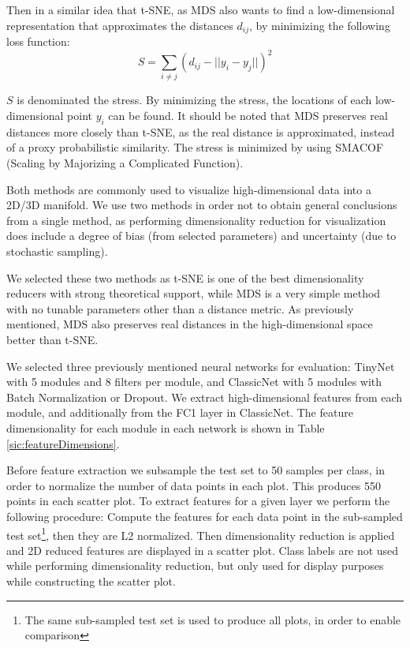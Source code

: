 \begin{description}
	Then in a similar idea that t-SNE, as MDS also wants to find a low-dimensional representation that approximates the distances $d_{ij}$, by minimizing the following loss function:
	\vspace*{1em}
	\begin{equation}
		S = \sum_{i \neq j} (d_{ij} - ||y_i - y_j||)^2
	\end{equation}
	
	$S$ is denominated the stress. By minimizing the stress, the locations of each low-dimensional point $y_i$ can be found. It should be noted that MDS preserves real distances more closely than t-SNE, as the real distance is approximated, instead of a proxy probabilistic similarity. The stress is minimized by using SMACOF (Scaling by Majorizing a Complicated Function).
	
\end{description}

Both methods are commonly used to visualize high-dimensional data into a 2D/3D manifold. We use two methods in order not to obtain general conclusions from a single method, as performing dimensionality reduction for visualization does include a degree of bias (from selected parameters) and uncertainty (due to stochastic sampling).

We selected these two methods as t-SNE is one of the best dimensionality reducers with strong theoretical support, while MDS is a very simple method with no tunable parameters other than a distance metric. As previously mentioned, MDS also preserves real distances in the high-dimensional space better than t-SNE.

We selected three previously mentioned neural networks for evaluation: TinyNet with 5 modules and 8 filters per module, and ClassicNet with 5 modules with Batch Normalization or Dropout. We extract high-dimensional features from each module, and additionally from the FC1 layer in ClassicNet. The feature dimensionality for each module in each network is shown in Table \ref{sic:featureDimensions}.

Before feature extraction we subsample the test set to 50 samples per class, in order to normalize the number of data points in each plot. This produces 550 points in each scatter plot. To extract features for a given layer we perform the following procedure: Compute the features for each data point in the sub-sampled test set\footnote[][7em]{The same sub-sampled test set is used to produce all plots, in order to enable comparison}, then they are L2 normalized. Then dimensionality reduction is applied and 2D reduced features are displayed in a scatter plot. Class labels are not used while performing dimensionality reduction, but only used for display purposes while constructing the scatter plot.

